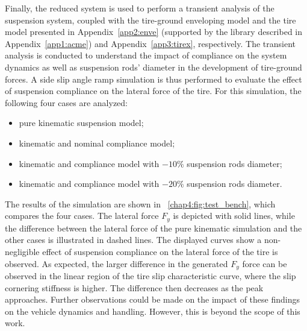 Finally, the reduced system is used to perform a transient analysis of the suspension system, coupled with the tire-ground enveloping model and the tire model presented in Appendix~\ref{app2:enve} (supported by the \Acme{} \cpp{} library described in Appendix~\ref{app1:acme}) and Appendix~\ref{app3:tirex}, respectively. The transient analysis is conducted to understand the impact of compliance on the system dynamics as well as suspension rods' diameter in the development of tire-ground forces. A side slip angle ramp simulation is thus performed to evaluate the effect of suspension compliance on the lateral force of the tire. For this simulation, the following four cases are analyzed:
%
\begin{itemize}
  \setlength\itemsep{0.0em}
  \item pure kinematic suspension model;
  \item kinematic and nominal compliance model;
  \item kinematic and compliance model with $-10\%$ suspension rods diameter;
  \item kinematic and compliance model with $-20\%$ suspension rods diameter.
\end{itemize}
%
The results of the simulation are shown in \figurename~\ref{chap4:fig:test_bench}, which compares the four cases. The lateral force $F_y$ is depicted with solid lines, while the difference between the lateral force of the pure kinematic simulation and the other cases is illustrated in dashed lines. The displayed curves show a non-negligible effect of suspension compliance on the lateral force of the tire is observed. As expected, the larger difference in the generated $F_y$ force can be observed in the linear region of the tire slip characteristic curve, where the slip cornering stiffness is higher. The difference then decreases as the peak approaches. Further observations could be made on the impact of these findings on the vehicle dynamics and handling. However, this is beyond the scope of this work.

